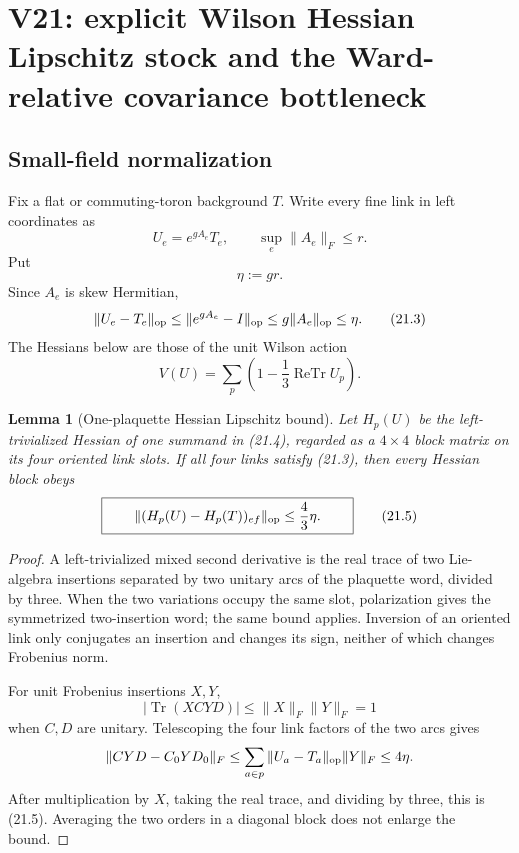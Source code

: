 \documentclass[11pt,oneside]{book}
\newtheorem{lemma}[theorem]{Lemma}
\theoremstyle{definition}
\theoremstyle{remark}
\begin{document}
\section{V21: explicit Wilson Hessian Lipschitz stock and the
Ward-relative covariance bottleneck}
\label{sec:e8v21}

\subsection{Small-field normalization}

Fix a flat or commuting-toron background \(T\).  Write every fine link
in left coordinates as
\[
                         U_e=e^{gA_e}T_e,\qquad
             \sup_e\|A_e\|_F\leq r.                \tag{21.1}
\]
Put
\[
                         \eta:=gr.                 \tag{21.2}
\]
Since \(A_e\) is skew Hermitian,
\[
\|U_e-T_e\|_{\rm op}
\leq\|e^{gA_e}-I\|_{\rm op}
\leq g\|A_e\|_{\rm op}\leq\eta.                    \tag{21.3}
\]
The Hessians below are those of the unit Wilson action
\[
 V(U)=\sum_p\left(1-\frac13\operatorname{ReTr}U_p\right).          \tag{21.4}
\]

\begin{lemma}[One-plaquette Hessian Lipschitz bound]
\label{lem:e8v21-one-plaquette}
Let \(H_p(U)\) be the left-trivialized Hessian of one summand in
(21.4), regarded as a \(4\times4\) block matrix on its four oriented
link slots.  If all four links satisfy (21.3), then every Hessian block
obeys
\[
\boxed{\qquad
\|(H_p(U)-H_p(T))_{ef}\|_{\rm op}
\leq\frac43\eta.
\qquad}                                                           \tag{21.5}
\]
\end{lemma}

\begin{proof}
A left-trivialized mixed second derivative is the real trace of two
Lie-algebra insertions separated by two unitary arcs of the plaquette
word, divided by three.  When the two variations occupy the same
slot, polarization gives the symmetrized two-insertion word; the same
bound applies.  Inversion of an oriented link only conjugates an
insertion and changes its sign, neither of which changes Frobenius
norm.

For unit Frobenius insertions \(X,Y\),
\[
 |\operatorname{Tr}(XCYD)|\leq\|X\|_F\|Y\|_F=1
\]
when \(C,D\) are unitary.  Telescoping the four link factors of the
two arcs gives
\[
\|CYD-C_0YD_0\|_F\leq
\sum_{a\in p}\|U_a-T_a\|_{\rm op}\|Y\|_F\leq4\eta.
\]
After multiplication by \(X\), taking the real trace, and dividing by
three, this is (21.5).  Averaging the two orders in a diagonal block
does not enlarge the bound.
\end{proof}
\end{document}
